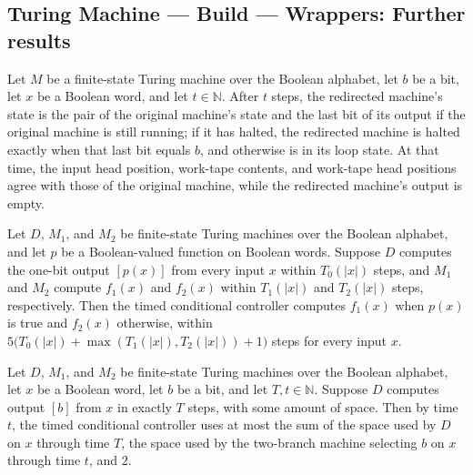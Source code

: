 \subsection*{Turing Machine --- Build --- Wrappers: Further results}

\begin{theorem}
\label{Turing.FinTM.redirectTM_runFrom}
\leanok
{}
Let $M$ be a finite-state Turing machine over the Boolean alphabet, let $b$ be a bit,
let $x$ be a Boolean word, and let $t \in \mathbb{N}$. After $t$ steps, the redirected
machine's state is the pair of the original machine's state and the last bit of its
output if the original machine is still running; if it has halted, the redirected
machine is halted exactly when that last bit equals $b$, and otherwise is in its loop
state. At that time, the input head position, work-tape contents, and work-tape head
positions agree with those of the original machine, while the redirected machine's
output is empty.
\end{theorem}

\begin{theorem}
\label{Turing.FinTM.timedCondTM_computes}
\leanok
{}
Let $D$, $M_1$, and $M_2$ be finite-state Turing machines over the Boolean alphabet, and
let $p$ be a Boolean-valued function on Boolean words. Suppose $D$ computes the one-bit
output $[p(x)]$ from every input $x$ within $T_0(|x|)$ steps, and $M_1$ and $M_2$
compute $f_1(x)$ and $f_2(x)$ within $T_1(|x|)$ and $T_2(|x|)$ steps, respectively. Then
the timed conditional controller computes $f_1(x)$ when $p(x)$ is true and $f_2(x)$
otherwise, within $5\bigl(T_0(|x|)+\max(T_1(|x|),T_2(|x|))+1\bigr)$ steps for every
input $x$.
\end{theorem}

\begin{theorem}
\label{Turing.FinTM.timedCondTM_spaceUsed}
\leanok
{}
Let $D$, $M_1$, and $M_2$ be finite-state Turing machines over the Boolean alphabet, let
$x$ be a Boolean word, let $b$ be a bit, and let $T,t\in\mathbb N$. Suppose $D$ computes
output $[b]$ from $x$ in exactly $T$ steps, with some amount of space. Then by time $t$,
the timed conditional controller uses at most the sum of the space used by $D$ on $x$
through time $T$, the space used by the two-branch machine selecting $b$ on $x$ through
time $t$, and $2$.
\end{theorem}
